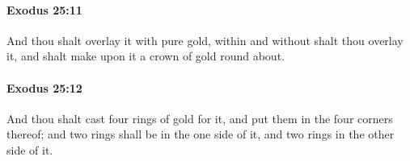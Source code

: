 		\paragraph{Exodus 25:11} %
			\label{EXODUS-25-11}

			And thou shalt overlay it with pure gold, within and without shalt thou overlay it, and shalt make upon it a crown of gold round about.


		\paragraph{Exodus 25:12} %
			\label{EXODUS-25-12}

			And thou shalt cast four rings of gold for it, and put them in the four corners thereof; and two rings shall be in the one side of it, and two rings in the other side of it.


